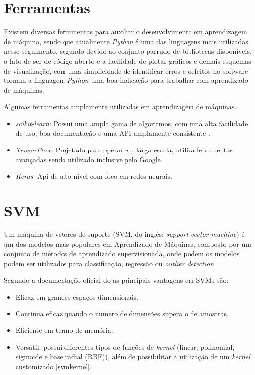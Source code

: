 \section{Ferramentas}
Existem diversas ferramentas para auxiliar o desenvolvimento em aprendizagem de máquina, sendo que atualmente \textit{Python} é uma das linguagens mais utilizadas nesse seguimento, segundo  devido ao conjunto parrudo de bibliotecas disponíveis, o fato de ser de código aberto e a facilidade de plotar gráficos e demais esquemas de visualização, com uma simplicidade de identificar erros e defeitos no software tornam a linguagem \textit{Python} uma boa indicação para trabalhar com aprendizado de máquinas.

Algumas ferramentas amplamente utilizadas em aprendizagem de máquinas.
\begin{itemize}
    \item \textit{scikit-learn}: Possui uma ampla gama de algoritmos, com uma alta facilidade de uso, boa documentação e uma API amplamente consistente \cite{scikit-learn}. 
    \item \textit{TensorFlow}: Projetado para operar em larga escala, utiliza ferramentas avançadas sendo utilizado inclusive pelo Google\cite{abadi2016tensorflow}
    \item \textit{Keras}: Api de alto nível com foco em redes neurais.
\end{itemize}

\section{SVM}

Um máquina de vetores de suporte (SVM, do inglês: \textit{support vector machine}) é um dos modelos mais populares em Aprendizado de Máquinas, composto por um conjunto de métodos de aprendizado supervisionada, onde podem os modelos podem ser utilizados para classificação, regressão ou \textit{outlier detection} \cite{scikit-learn}.

Segundo a documentação oficial do  as principais vantagens em SVMs são:

\begin{itemize}
    \item Eficaz em grandes espaços dimensionais.
    \item Continua eficaz quando o numero de dimensões supera o de amostras.
    \item Eficiente em termo de memória.
    \item Versátil: possui diferentes tipos de funções de \textit{kernel} (linear, polinomial, sigmoide e base radial (RBF)), além de possibilitar a utilização de um \textit{kernel} customizado \ref{svmkernel}.
\end{itemize}

